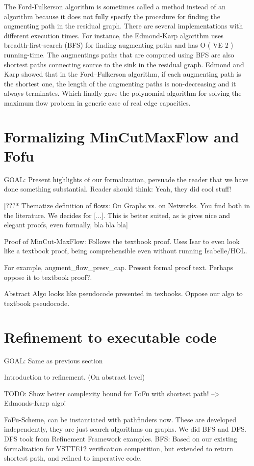 \documentclass{llncs}
\begin{document}
The Ford-Fulkerson algorithm is sometimes called a method instead of an algorithm because it does not fully specify the procedure for finding the augmenting path in the residual graph. There are several implementations with different execution times. For instance, the Edmond-Karp algorithm uses breadth-first-search (BFS) for finding augmenting paths and has O ( VE 2 ) running-time. The augmentings paths that are computed using BFS are also shortest paths connecting source to the sink in the residual graph. Edmond and Karp showed that in the Ford–Fulkerson algorithm, if each augmenting path is the shortest one, the length of the augmenting paths is non-decreasing and it always terminates. Which finally gave the polynomial algorithm for solving the maximum flow problem in generic case of real edge capacities.


\section{Formalizing MinCutMaxFlow and Fofu}
  GOAL: Present highlights of our formalization, persuade the reader that we have done something substantial.
    Reader should think: Yeah, they did cool stuff!

  [???* Thematize definition of flows: On Graphs vs. on Networks. You find both in the literature. 
      We decides for [...]. This is better suited, as is gives nice and elegant proofs, even formally, bla bla bla]
    
  Proof of MinCut-MaxFlow: Follows the textbook proof.
    Uses Isar to even look like a textbook proof, being comprehensible even without running
      Isabelle/HOL.
      
    For example, augment_flow_presv_cap.
      Present formal proof text. Perhaps oppose it to textbook proof?.
    
  Abstract Algo looks like pseudocode presented in texbooks.
    Oppose our algo to textbook pseudocode.
    
    
\section{Refinement to executable code}
  GOAL: Same as previous section
  
  Introduction to refinement. (On abstract level)

  TODO: Show better complexity bound for FoFu with shortest path! --> Edmonds-Karp algo!
 
  
  FoFu-Scheme, can be instantiated with pathfinders now.
  These are developed independently, they are just search algorithms on graphs.
    We did BFS and DFS.
      DFS took from Refinement Framework examples.
      BFS: Based on our existing formalization for VSTTE12 verification competition, 
        but extended to return shortest path, and refined to imperative code.
    
\end{document}
